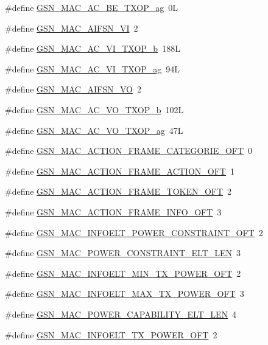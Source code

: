 \begin{DoxyCompactItemize}
\item 
\#define \hyperlink{a00523_a0b0c9c617fa57a50f5a70cd09f733d5c}{GSN\_\-MAC\_\-AC\_\-BE\_\-TXOP\_\-ag}~0L
\item 
\#define \hyperlink{a00523_a886e3b51467823185c2a139c485fc881}{GSN\_\-MAC\_\-AIFSN\_\-VI}~2
\item 
\#define \hyperlink{a00523_af41dfcb86f8d6bba057fcadf9f2eeed4}{GSN\_\-MAC\_\-AC\_\-VI\_\-TXOP\_\-b}~188L
\item 
\#define \hyperlink{a00523_a8808ccaa913e1e40bc760d961601e147}{GSN\_\-MAC\_\-AC\_\-VI\_\-TXOP\_\-ag}~94L
\item 
\#define \hyperlink{a00523_a3f460be3718f0d84eab49e97e9a13e0c}{GSN\_\-MAC\_\-AIFSN\_\-VO}~2
\item 
\#define \hyperlink{a00523_aa4dd2c48cf49dc7c2650714c32bdb1cd}{GSN\_\-MAC\_\-AC\_\-VO\_\-TXOP\_\-b}~102L
\item 
\#define \hyperlink{a00523_add2eb5c2203b0c2084b4f650c08ee721}{GSN\_\-MAC\_\-AC\_\-VO\_\-TXOP\_\-ag}~47L
\item 
\#define \hyperlink{a00523_a9314f0bfe7375c48649ff1e049f6dd0f}{GSN\_\-MAC\_\-ACTION\_\-FRAME\_\-CATEGORIE\_\-OFT}~0
\item 
\#define \hyperlink{a00523_a885ba510e2ac1fc53eb7dfd9c4c29f36}{GSN\_\-MAC\_\-ACTION\_\-FRAME\_\-ACTION\_\-OFT}~1
\item 
\#define \hyperlink{a00523_ac0811da81b1789bb7cf7385838c992c8}{GSN\_\-MAC\_\-ACTION\_\-FRAME\_\-TOKEN\_\-OFT}~2
\item 
\#define \hyperlink{a00523_a1ee0e3e172df88bda9fe621b016617e9}{GSN\_\-MAC\_\-ACTION\_\-FRAME\_\-INFO\_\-OFT}~3
\item 
\#define \hyperlink{a00523_a2647da203de9fee58515b35bb50c6c19}{GSN\_\-MAC\_\-INFOELT\_\-POWER\_\-CONSTRAINT\_\-OFT}~2
\item 
\#define \hyperlink{a00523_a80b810016a25731cabb7ca3d35bb96cf}{GSN\_\-MAC\_\-POWER\_\-CONSTRAINT\_\-ELT\_\-LEN}~3
\item 
\#define \hyperlink{a00523_ac0fbdb357f64acc815bae11cf9f420b4}{GSN\_\-MAC\_\-INFOELT\_\-MIN\_\-TX\_\-POWER\_\-OFT}~2
\item 
\#define \hyperlink{a00523_a64f9e5c865d8857a54ff2750b14811d4}{GSN\_\-MAC\_\-INFOELT\_\-MAX\_\-TX\_\-POWER\_\-OFT}~3
\item 
\#define \hyperlink{a00523_aad5e9a40464bfb319dee31b2584df6f0}{GSN\_\-MAC\_\-POWER\_\-CAPABILITY\_\-ELT\_\-LEN}~4
\item 
\#define \hyperlink{a00523_aad82dbe8d6459eb7abd19da383cfefbe}{GSN\_\-MAC\_\-INFOELT\_\-TX\_\-POWER\_\-OFT}~2

\end{DoxyCompactItemize}
